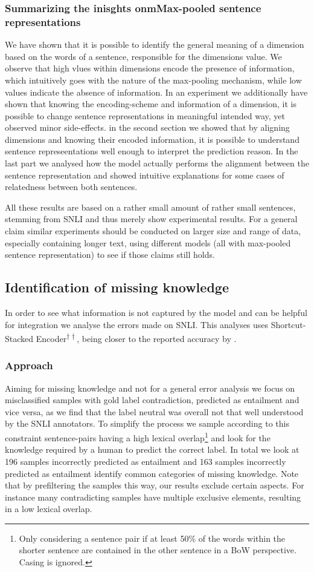\subsubsection{Summarizing the inisghts onmMax-pooled sentence representations}
We have shown that it is possible to identify the general meaning of a dimension based on the words of a sentence, responsible for the dimensions value. We observe that high vlues within dimensions encode the presence of information, which intuitively goes with the nature of the max-pooling mechanism, while low values indicate the absence of information. In an experiment we additionally have shown that knowing the encoding-scheme and information of a dimension, it is possible to change sentence representations in meaningful intended way, yet observed minor side-effects. in the second section we showed that by aligning dimensions and knowing their encoded information, it is possible to understand sentence represeentations well enough to interpret the prediction reason. In the last part we analysed how the model actually performs the alignment between the sentence representation and showed intuitive explanations for some cases of relatedness between both sentences.
\newline

\noindent
All these results are based on a rather small amount of rather small sentences, stemming from \ac{SNLI} and thus merely show experimental results. For a general claim similar experiments should be conducted on larger size and range of data, especially containing longer text, using different models (all with max-pooled sentence representation) to see if those claims still holds. 
\subsection{Identification of missing knowledge}
In order to see what information is not captured by the model and can be helpful for integration we analyse the errors made on \ac{SNLI}. This analyses uses Shortcut-Stacked Encoder\textsuperscript{$\dagger\dagger$}, being closer to the reported accuracy by \cite{nie2017shortcut}. 
\subsubsection{Approach}
Aiming for missing knowledge and not for a general error analysis we focus on misclassified samples with gold label contradiction, predicted as entailment and vice versa, as we find that the label neutral was overall not that well understood by the \ac{SNLI} annotators. To simplify the process we sample according to this constraint sentence-pairs having a high lexical overlap\footnote{Only considering a sentence pair if at least 50\% of the words within the shorter sentence are contained in the other sentence in a \ac{BoW} perspective. Casing is ignored.} and look for the knowledge required by a human to predict the correct label. In total we look at 196 samples incorrectly predicted as entailment and 163 samples incorrectly predicted as entailment identify common categories of missing knowledge. Note that by prefiltering the samples this way, our results exclude certain aspects. For instance many contradicting samples have multiple exclusive elements, resulting in a low lexical overlap.
